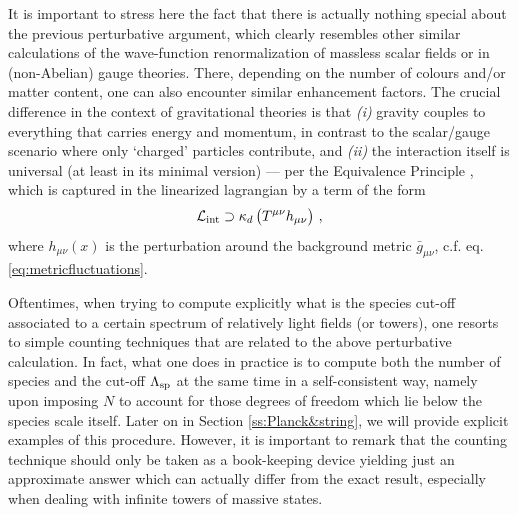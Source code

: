 It is important to stress here the fact that there is actually nothing special about the previous perturbative argument, which clearly resembles other similar calculations of the wave-function renormalization of massless scalar fields or in (non-Abelian) gauge theories. There, depending on the number of colours and/or matter content, one can also encounter similar enhancement factors. The crucial difference in the context of gravitational theories is that \emph{(i)} gravity couples to everything that carries energy and momentum, in contrast to the scalar/gauge scenario where only `charged' particles contribute, and \emph{(ii)} the interaction itself is universal (at least in its minimal version) --- per the Equivalence Principle \cite{Wald:1984rg}, which is captured in the linearized lagrangian by a term of the form
%
\begin{equation}
\mathcal{L}_{\rm int} \supset \kappa_d \left( T^{\mu \nu} h_{\mu \nu}\right)\, ,
\end{equation}
%
where $h_{\mu \nu}(x)$ is the perturbation around the background metric $\bar{g}_{\mu \nu}$, c.f. eq. \eqref{eq:metricfluctuations}.

Oftentimes, when trying to compute explicitly what is the species cut-off associated to a certain spectrum of relatively light fields (or towers), one resorts to simple counting techniques that are related to the above perturbative calculation. In fact, what one does in practice is to compute both the number of species and the cut-off $\Lambda_{\text{sp}}$ at the same time in a self-consistent way, namely upon imposing $N$ to account for those degrees of freedom which lie below the species scale itself. Later on in Section \ref{ss:Planck&string}, we will provide explicit examples of this procedure. However, it is important to remark that the counting technique should only be taken as a book-keeping device yielding just an approximate answer which can actually differ from the exact result, especially when dealing with infinite towers of massive states.

